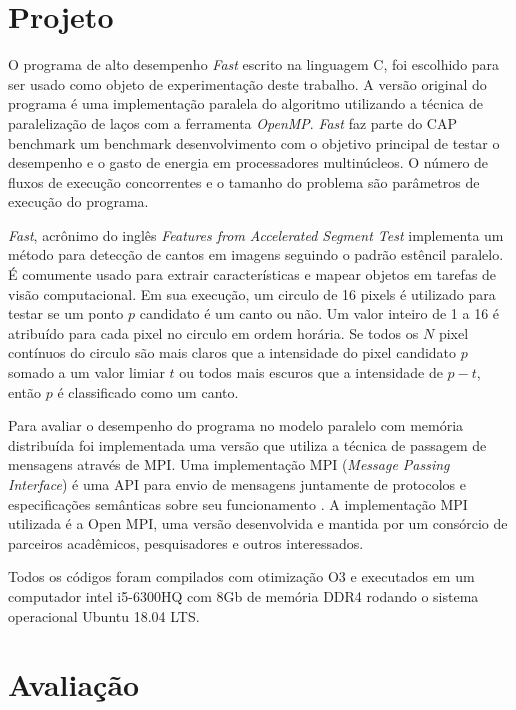 \documentclass[12pt]{article}
\begin{document}
\section{Projeto} \label{sec:projeto}

O programa de alto desempenho \textit{Fast} escrito na linguagem C, foi escolhido para ser usado como objeto de experimentação deste trabalho. A versão original do programa é uma implementação paralela do algoritmo utilizando a técnica de paralelização de laços com a ferramenta \textit{OpenMP}. \textit{Fast} faz parte do CAP benchmark \cite{souza2017cap} um benchmark desenvolvimento com o objetivo principal de testar o desempenho e o gasto de energia em processadores multinúcleos. O número de fluxos de execução concorrentes e o tamanho do problema são parâmetros de execução do programa.

\textit{Fast}, acrônimo do inglês \textit{Features from Accelerated Segment Test} implementa um método para detecção de cantos em imagens seguindo o padrão estêncil paralelo. É comumente usado para extrair características e mapear objetos em tarefas de visão computacional. Em sua execução, um circulo de 16 pixels é utilizado para testar se um ponto \(p\) candidato é um canto ou não. Um valor inteiro de 1 a 16 é atribuído para cada pixel no circulo em ordem horária. Se todos os \(N\) pixel contínuos do circulo são mais claros que a intensidade do pixel candidato \(p\) somado a um valor limiar \(t\) ou todos mais escuros que a intensidade de \(p - t \), então \(p\) é classificado como um canto.
	
Para avaliar o desempenho do programa no modelo paralelo com memória distribuída foi implementada uma versão que utiliza a técnica de passagem de mensagens através de MPI. Uma implementação MPI (\textit{Message Passing Interface}) é uma API para envio de mensagens juntamente de protocolos e especificações semânticas sobre seu funcionamento \cite{Lusk96ahigh-performance}. A implementação MPI utilizada é a Open MPI, uma versão desenvolvida e mantida por um consórcio de parceiros acadêmicos, pesquisadores e outros interessados.



Todos os códigos foram compilados com otimização O3 e executados em um computador intel i5-6300HQ com 8Gb de memória DDR4 rodando o sistema operacional Ubuntu 18.04 LTS.

\section{Avaliação}
\end{document}
